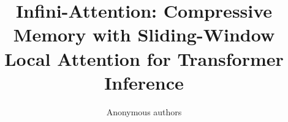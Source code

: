 \title{\textbf{Infini-Attention: Compressive Memory with Sliding-Window Local Attention for Transformer Inference}}

\author{Anonymous authors}

